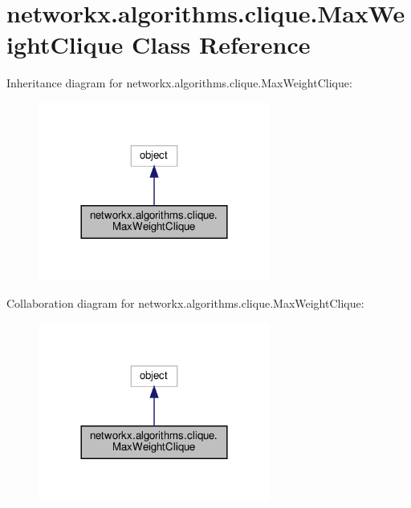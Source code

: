 \hypertarget{classnetworkx_1_1algorithms_1_1clique_1_1MaxWeightClique}{}\section{networkx.\+algorithms.\+clique.\+Max\+Weight\+Clique Class Reference}
\label{classnetworkx_1_1algorithms_1_1clique_1_1MaxWeightClique}


Inheritance diagram for networkx.\+algorithms.\+clique.\+Max\+Weight\+Clique\+:
\nopagebreak
\begin{figure}[H]
\begin{center}
\leavevmode
\includegraphics[width=216pt]{classnetworkx_1_1algorithms_1_1clique_1_1MaxWeightClique__inherit__graph}
\end{center}
\end{figure}


Collaboration diagram for networkx.\+algorithms.\+clique.\+Max\+Weight\+Clique\+:
\nopagebreak
\begin{figure}[H]
\begin{center}
\leavevmode
\includegraphics[width=216pt]{classnetworkx_1_1algorithms_1_1clique_1_1MaxWeightClique__coll__graph}
\end{center}
\end{figure}
